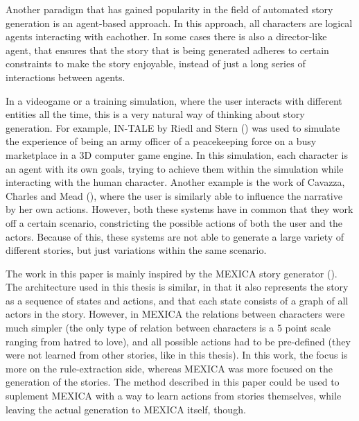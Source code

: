 Another paradigm that has gained popularity in the field of automated story
generation is an agent-based approach. In this approach, all characters are
logical agents interacting with eachother. In some cases there is also a
director-like agent, that ensures that the story that is being generated adheres
to certain constraints to make the story enjoyable, instead of just a long
series of interactions between agents.

In a videogame or a training simulation, where the user interacts with different
entities all the time, this is a very natural way of thinking about story
generation. For example, IN-TALE by Riedl and Stern (\cite{riedl2006believable})
was used to simulate the experience of being an army officer of a peacekeeping force
on a busy marketplace in a 3D computer game engine. In this simulation, each
character is an agent with its own goals, trying to achieve them within the
simulation while interacting with the human character. Another example is the
work of Cavazza, Charles and Mead (\cite{cavazza2002interacting}), where the
user is similarly able to influence the narrative by her own actions. However,
both these systems have in common that they work off a certain scenario,
constricting the possible actions of both the user and the actors. Because of
this, these systems are not able to generate a large variety of different
stories, but just variations within the same scenario.

The work in this paper is mainly inspired by the MEXICA story generator
(\cite{perez2001mexica}).
The architecture used in this thesis is similar, in that it also represents the
story as a sequence of states and actions, and that each state consists of a
graph of all actors in the story.
However, in MEXICA the relations between characters were much simpler (the only
type of relation between characters is a 5 point scale ranging from hatred to
love), and 
all possible actions had to be pre-defined (they were not learned from other
stories, like in this thesis). In this work, the focus is more on
the rule-extraction side, whereas MEXICA was more focused on the generation of
the stories. The method described in this paper could be used to suplement
MEXICA with a way to learn actions from stories themselves, while leaving the
actual generation to MEXICA itself, though.
